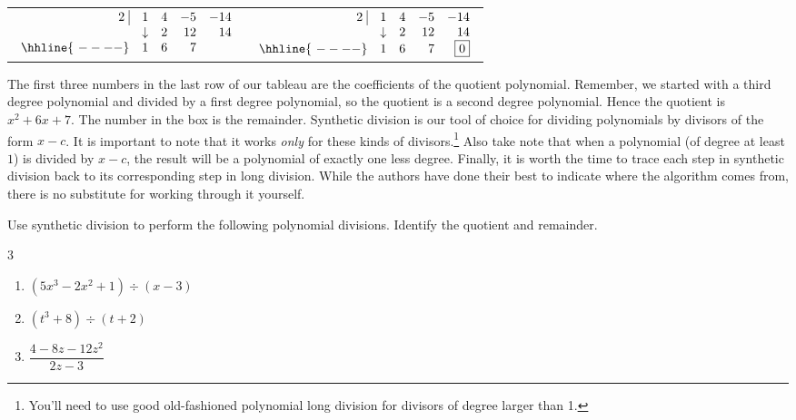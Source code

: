 \begin{center}

\begin{tabular}{cc}

$ \begin{array}{rrrrr}
  2 \, \, \vline& 1 & 4 & -5  & -14 \\
   & \downarrow &  2  &  12  & 14 \\ \hhline{~----} 
  & 1  &   6  & 7  &    \\  
\end{array}$ \hspace{1in} 
&
$ \begin{array}{rrrrr}
  2 \, \, \vline& 1 & 4 & -5  & -14 \\
   & \downarrow &  2  &  12  & 14 \\ \hhline{~----} 
  & 1  &   6  & 7  &  \fbox{$0$}  \\  
\end{array}$ \\

\end{tabular}

\end{center}

The first three numbers in the last row of our tableau are the coefficients of the quotient polynomial.  Remember, we started with a third degree polynomial and divided by a first degree polynomial, so the quotient is a second degree polynomial.  Hence the quotient is $x^2+6x+7$.  The number in the box is the remainder.  Synthetic division is our tool of choice for dividing polynomials by divisors of the form $x-c$.  It is important to note that it works \emph{only} for these kinds of divisors.\footnote{You'll need to use good old-fashioned polynomial long division for divisors of degree larger than 1.} Also take note that when a polynomial (of degree at least $1$) is divided by $x-c$, the result will be a polynomial of exactly one less degree. Finally, it is  worth the time to trace each step in synthetic division back to its corresponding step in long division.  While the authors have done their best to indicate where the algorithm comes from, there is no substitute for working through it yourself.

\begin{example}  Use synthetic division to perform the following polynomial divisions.  Identify the quotient and remainder. 

\begin{multicols}{3}
\begin{enumerate}
\item  $\left(5x^3 - 2x^2 + 1\right) \div (x-3)$ 
\item  $\left(t^3+8\right) \div (t+2)$ 
\item  $\dfrac{4-8z-12z^2}{2z-3}$
\end{enumerate}
\end{multicols}

\end{example}

